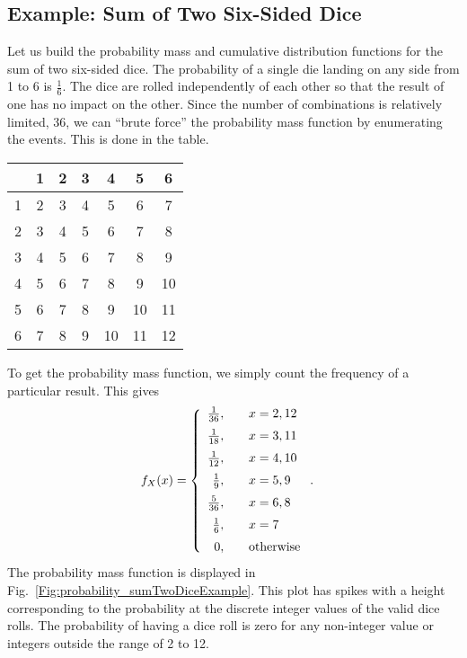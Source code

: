 \subsection{Example: Sum of Two Six-Sided Dice}

Let us build the probability mass and cumulative distribution functions for the sum of two six-sided dice. The probability of a single die landing on any side from 1 to 6 is $\tfrac{1}{6}$. The dice are rolled independently of each other so that the result of one has no impact on the other. Since the number of combinations is relatively limited, 36, we can ``brute force'' the probability mass function by enumerating the events. This is done in the table.

\begin{table}[!ht]
\begin{center}
\begin{tabular}{|c|c|c|c|c|c|c|} \hline
    &  1 &  2 &  3 &  4 &  5 &  6 \\ \hline
  1 &  2 &  3 &  4 &  5 &  6 &  7 \\ \hline
  2 &  3 &  4 &  5 &  6 &  7 &  8 \\ \hline
  3 &  4 &  5 &  6 &  7 &  8 &  9 \\ \hline
  4 &  5 &  6 &  7 &  8 &  9 & 10 \\ \hline
  5 &  6 &  7 &  8 &  9 & 10 & 11 \\ \hline
  6 &  7 &  8 &  9 & 10 & 11 & 12 \\ \hline
\end{tabular}
\end{center}
\end{table}%

To get the probability mass function, we simply count the frequency of a particular result. This gives
\begin{align}
  f_X(x) &= \left\{ \begin{array}{r l}
  \frac{1}{36}, & \quad x = 2, 12 \vspace{0.2cm} \\
  \frac{1}{18}, & \quad x = 3, 11 \vspace{0.2cm} \\
  \frac{1}{12}, & \quad x = 4, 10 \vspace{0.2cm} \\
  \frac{1}{9},  & \quad x = 5, 9  \vspace{0.2cm} \\
  \frac{5}{36}, & \quad x = 6, 8  \vspace{0.2cm} \\
  \frac{1}{6},  & \quad x = 7     \vspace{0.2cm} \\
  0,            & \quad \text{otherwise} \\ \end{array} \right. .
\end{align}
The probability mass function is displayed in Fig.~\ref{Fig:probability_sumTwoDiceExample}. This plot has spikes with a height corresponding to the probability at the discrete integer values of the valid dice rolls. The probability of having a dice roll is zero for any non-integer value or integers outside the range of 2 to 12.

